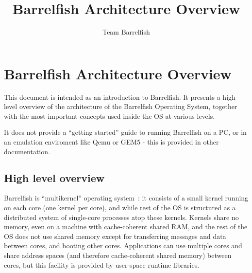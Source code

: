\documentclass[a4paper,twoside]{report} %
\title{Barrelfish Architecture Overview}   %
\author{Team Barrelfish}	%
\begin{document}
\maketitle

%
%
\begin{versionhistory}
\end{versionhistory}

\tableofcontents		%



\chapter{Barrelfish Architecture Overview}

This document is intended as an introduction to Barrelfish. 
It presents a high level overview of the architecture of the Barrelfish
Operating System, together with the most important concepts used
inside the OS at various levels.  

It does not provide a ``getting started'' guide to running Barrelfish
on a PC, or in an emulation enviroment like Qemu or GEM5 - this is
provided in other documentation.  

\section{High level overview}\label{sec:overview}

Barrelfish is ``multikernel'' operating
system~\cite{barrelfish:sosp09}: it consists of a small kernel running on each core (one kernel per core), and while rest of the
OS is structured as a distributed system of single-core processes atop
these kernels.  Kernels share no memory, even on a machine with
cache-coherent shared RAM, and the rest of the OS does not use shared
memory except for transferring messages and data between cores, and
booting other cores.  Applications can use multiple cores and share
address spaces (and therefore cache-coherent shared memory) between
cores, but this facility is provided by user-space runtime libraries. 
\end{document}
